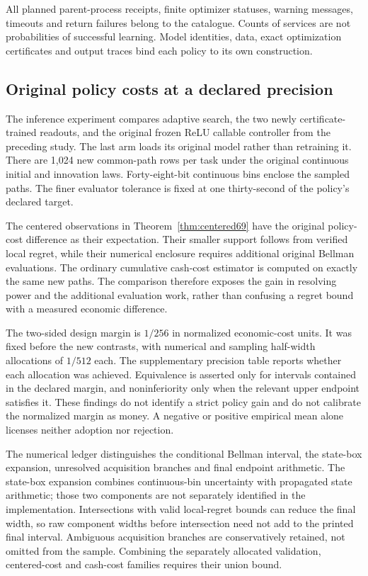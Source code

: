 All planned parent-process receipts, finite optimizer statuses, warning messages, timeouts and return failures belong to the catalogue. Counts of services are not probabilities of successful learning. Model identities, data, exact optimization certificates and output traces bind each policy to its own construction.



\subsection{Original policy costs at a declared precision}
The inference experiment compares adaptive search, the two newly certificate-trained readouts, and the original frozen ReLU callable controller from the preceding study. The last arm loads its original model rather than retraining it. There are 1,024 new common-path rows per task under the original continuous initial and innovation laws. Forty-eight-bit continuous bins enclose the sampled paths. The finer evaluator tolerance is fixed at one thirty-second of the policy's declared target.

The centered observations in Theorem~\ref{thm:centered69} have the original policy-cost difference as their expectation. Their smaller support follows from verified local regret, while their numerical enclosure requires additional original Bellman evaluations. The ordinary cumulative cash-cost estimator is computed on exactly the same new paths. The comparison therefore exposes the gain in resolving power and the additional evaluation work, rather than confusing a regret bound with a measured economic difference.



The two-sided design margin is $1/256$ in normalized economic-cost units. It was fixed before the new contrasts, with numerical and sampling half-width allocations of $1/512$ each. The supplementary precision table reports whether each allocation was achieved. Equivalence is asserted only for intervals contained in the declared margin, and noninferiority only when the relevant upper endpoint satisfies it. These findings do not identify a strict policy gain and do not calibrate the normalized margin as money. A negative or positive empirical mean alone licenses neither adoption nor rejection.

The numerical ledger distinguishes the conditional Bellman interval, the state-box expansion, unresolved acquisition branches and final endpoint arithmetic. The state-box expansion combines continuous-bin uncertainty with propagated state arithmetic; those two components are not separately identified in the implementation. Intersections with valid local-regret bounds can reduce the final width, so raw component widths before intersection need not add to the printed final interval. Ambiguous acquisition branches are conservatively retained, not omitted from the sample. Combining the separately allocated validation, centered-cost and cash-cost families requires their union bound.

